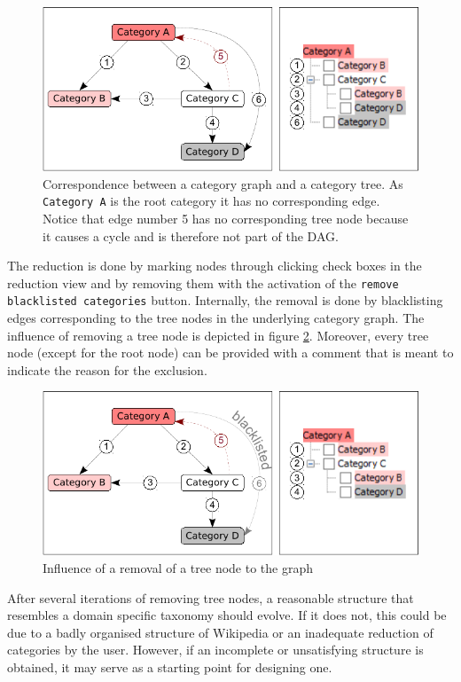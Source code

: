 \documentclass{scrartcl}
\begin{document}
\begin{figure}[ht]
\centering
\includegraphics[scale=0.8]{figures/graph_tree.pdf}
\caption{Correspondence between a category graph and a category tree. As \texttt{Category A} is the root category it has no corresponding edge. Notice that edge number 5 has no corresponding tree node because it causes a cycle and is therefore not part of the DAG.}
\label{fig:graph_tree}
\end{figure}

The reduction is done by marking nodes through clicking check boxes in the reduction view and by removing them with the activation of the \texttt{remove blacklisted categories} button. Internally, the removal is done by blacklisting edges corresponding to the tree nodes in the underlying category graph. The influence of removing a tree node is depicted in figure \ref{fig:graph_tree_blacklisted}. Moreover, every tree node (except for the root node) can be provided with a comment that is meant to indicate the reason for the exclusion.

\begin{figure}[ht]
\centering
\includegraphics[scale=0.8]{figures/graph_tree_blacklisted.pdf}
\caption{Influence of a removal of a tree node to the graph}
\label{fig:graph_tree_blacklisted}
\end{figure}

After several iterations of removing tree nodes, a reasonable structure that resembles a domain specific taxonomy should evolve. If it does not, this could be due to a badly organised structure of Wikipedia or an inadequate reduction of categories by the user.  However, if an incomplete or unsatisfying structure is obtained, it may serve as a starting point for designing one.
\end{document}
